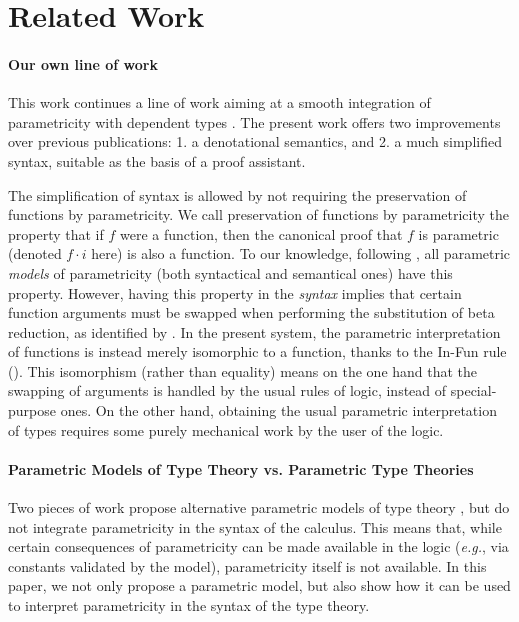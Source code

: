 \documentclass[english]{PaperTools/latex/entcs}
\theoremstyle{plain}
\theoremstyle{definition}
\theoremstyle{remark}
\newcommand\param[1]{\!\cdot\!#1}
\def\eg{\textit{e.g.}}
\begin{document}
\section{Related Work}

\paragraph{Our own line of work}
This work continues a line of work aiming at a smooth integration of
parametricity with dependent types
\citep{bernardy_parametricity_2010,bernardy_realizability_2011,bernardy_proofs_2012,bernardy_computational_2012,bernardy_type-theory_2013}. The present work offers two improvements over previous publications:
1. a denotational semantics, and
2. a much simplified syntax, suitable as the basis of a proof assistant.

The simplification of syntax is allowed by not requiring the preservation
of functions by parametricity. We call preservation of functions by
parametricity the property that if $f$ were a function, then the
canonical proof that $f$ is parametric (denoted $f \param i$ here) is
also a function. To our knowledge, following \citet{reynolds_types_1983}, all parametric \emph{models} of parametricity (both syntactical and semantical ones) have this property.
However, having this property in the \emph{syntax} implies that
certain function arguments must be swapped when performing the
substitution of beta reduction, as identified by
\citet{bernardy_computational_2012}.  In the present system, the
parametric interpretation of functions is instead merely isomorphic to
a function, thanks to the {\sc In-Fun} rule (). This
isomorphism (rather than equality) means on the one hand that the
swapping of arguments is handled by the usual rules of logic, instead
of special-purpose ones. On the other hand, obtaining the usual
parametric interpretation of types requires some purely mechanical
work by the user of the logic.

\paragraph{Parametric Models of Type Theory vs. Parametric Type Theories}
Two pieces of work propose alternative parametric models of
type theory
\citep{atkey_relationally_2014,krishnaswami_internalizing_2013}, but
do not integrate parametricity in the syntax of the calculus. This
means that, while certain consequences of parametricity can be made
available in the logic (\eg, via constants validated by the model),
parametricity itself is not available. In this paper, we not only
propose a parametric model, but also show how it can be used to
interpret parametricity in the syntax of the type theory.
\end{document}
